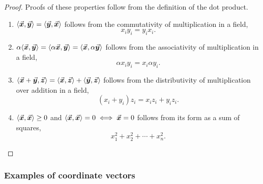 \documentclass[MathsNotesBase.tex]{subfiles}
\begin{document}
{	\bigskip
	\begin{proof}
		\newcommand\vx{\V{x}}
		\newcommand\vy{\V{y}}
		\newcommand\vz{\V{z}}
		Proofs of these properties follow from the definition of the dot product.
		\begin{enumerate}[label=(\roman*)]
			\item{$\langle \vx, \vy \rangle = \langle \vy, \vx \rangle$ follows from the commutativity of multiplication in a field,
				\[ x_iy_i = y_ix_i. \]
			}
			\item{$\alpha\langle \vx, \vy \rangle = \langle \alpha \vx, \vy \rangle = \langle \vx, \alpha \vy \rangle$ follows from the associativity of multiplication in a field, 
				\[ \alpha x_i y_i = x_i \alpha y_i. \]
			}
			\item{$\langle \vx+\vy, \vz \rangle = \langle \vx, \vz \rangle + \langle \vy, \vz \rangle$ follows from the distributivity of multiplication over addition in a field,
				\[ (x_i + y_i)z_i = x_iz_i + y_iz_i. \]
			}
			\item{$\langle \vx, \vx \rangle \geq 0$ and $\langle \vx, \vx \rangle = 0 \iff \vx = 0$ follows from its form as a sum of squares,
				\[ x_1^2 + x_2^2 + \cdots + x_n^2. \]
			}
		\end{enumerate}
	\end{proof}
	
	\bigskip
	\subsubsection{Examples of coordinate vectors}
	\begin{exe}
	\end{exe}
	

}
\end{document}
